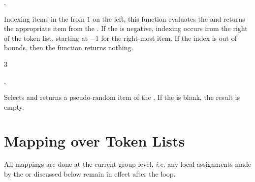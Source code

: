 \documentclass[oneside]{book}
\let\tn=\cs
\begin{document}
\begin{function}{\TlItem,\TlVarItem}
\begin{syntax}
  
  
\end{syntax}
Indexing items in the  from $1$ on the left, this
function evaluates the  and returns the
appropriate item from the .
If the  is negative, indexing occurs from
the right of the token list, starting at $-1$ for the right-most item.
If the index is out of bounds, then the function returns nothing.
\begin{demohigh}
 {3}
\end{demohigh}
\end{function}

\begin{function}{\TlRandItem,\TlVarRandItem}
\begin{syntax}
 
 
\end{syntax}
Selects and returns a pseudo-random item of the .
If the  is blank, the result is empty.
\begin{demohigh}
\end{demohigh}
\end{function}

\section{Mapping over Token Lists}

All mappings are done at the current group level, \emph{i.e.} any
local assignments made by the  or  discussed
below remain in effect after the loop.
\end{document}
